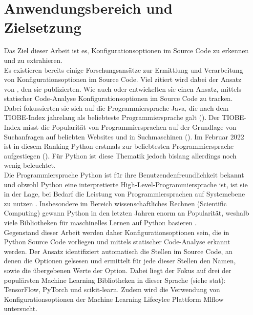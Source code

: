\documentclass[german,bachelor]{swsLeipzig}
\begin{document}
\section{Anwendungsbereich und Zielsetzung}
Das Ziel dieser Arbeit ist es, Konfigurationsoptionen im Source Code zu erkennen und zu extrahieren. \\

Es existieren bereits einige Forschungsansätze zur Ermittlung und Verarbeitung von Konfigurationsoptionen im Source Code.
Viel zitiert wird dabei der Ansatz von \citeauthor{10.1145/1985793.1985812}, den sie \citeyear{10.1145/1985793.1985812} publizierten.
Wie auch \citeauthor{7774519} oder \citeauthor{8049300} entwickelten sie einen Ansatz, mittels statischer Code-Analyse Konfigurationsoptionen
im Source Code zu tracken.
Dabei fokussierten sie sich auf die Programmiersprache Java, die nach dem TIOBE-Index jahrelang als beliebteste Programmiersprache galt (\citeyear{enwiki:1077809155}).
Der TIOBE-Index misst die Popularität von Programmiersprachen auf der Grundlage von Suchanfragen auf beliebten Websites und in Suchmaschinen (\citeyear{enwiki:1077809155}).
Im Februar 2022 ist in diesem Ranking Python erstmals zur beliebtesten Programmiersprache aufgestiegen (\citeyear{enwiki:1077809155}).
Für Python ist diese Thematik jedoch bislang allerdings noch wenig beleuchtet. \\

Die Programmiersprache Python ist für ihre Benutzendenfreundlichkeit bekannt und obwohl Python eine interpretierte High-Level-Programmiersprache ist,
ist sie in der Lage, bei Bedarf die Leistung von Programmiersprachen auf Systemebene zu nutzen \cite[S. 2]{2020}.
Insbesondere im Bereich wissenschaftliches Rechnen (Scientific Computing) gewann Python in den letzten Jahren enorm an Popularität,
weshalb viele Bibliotheken für maschinelles Lernen auf Python basieren \cite[S. 2]{2020}. \\

Gegenstand dieser Arbeit werden daher Konfigurationsoptionen sein, die in Python Source Code vorliegen und mittels statischer Code-Analyse erkannt werden.
Der Ansatz identifiziert automatisch die Stellen im Source Code, an denen die Optionen gelsesen und ermittelt für jede dieser Stellen den Namen,
sowie die übergebenen Werte der Option.
Dabei liegt der Fokus auf drei der populärsten Machine Learning Bibliotheken in dieser Sprache (siehe stat): TensorFlow, PyTorch und scikit-learn.
Zudem wird die Verwendung von Konfigurationsoptionen der Machine Learning Lifecylce Plattform Mlflow untersucht. \\
\end{document}
